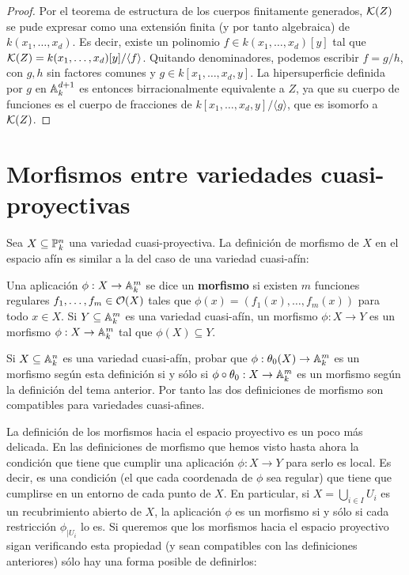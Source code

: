 \documentclass[ACGA.tex]{subfiles}
\begin{document}
\begin{proof} Por el teorema de estructura de los cuerpos finitamente generados, ${\mathcal K}(Z)$ se pude expresar como una extensión finita (y por tanto algebraica) de $k(x_1,\ldots,x_d)$. Es decir, existe un polinomio $f\in k(x_1,\ldots,x_d)[y]$ tal que ${\mathcal K}(Z)=k(x_1,\ldots,x_d)[y]/\langle f\rangle$. Quitando denominadores, podemos escribir $f=g/h$, con $g,h$ sin factores comunes y $g\in k[x_1,\ldots,x_d,y]$. La hipersuperficie definida por $g$ en $\mathbb{A}^{d+1}_k$ es entonces birracionalmente equivalente a $Z$, ya que su cuerpo de funciones es el cuerpo de fracciones de $k[x_1,\ldots,x_d,y]/\langle g\rangle$, que es isomorfo a ${\mathcal K}(Z)$.
\end{proof}





 




\section{Morfismos entre variedades cuasi-proyectivas}

Sea $X\subseteq\mathbb{P}^n_k$ una variedad cuasi-proyectiva. La definición de morfismo de $X$ en el espacio afín es similar a la del caso de una variedad cuasi-afín:

\begin{defi}
 Una aplicación $\phi:X\to \mathbb{A}^m_k$ se dice un {\bf morfismo} si existen $m$ funciones regulares $f_1,\ldots,f_m\in{\mathcal O}(X)$ tales que $\phi(x)=(f_1(x),\ldots,f_m(x))$ para todo $x\in X$. Si $Y\subseteq\mathbb{A}^m_k$ es una variedad cuasi-afín, un morfismo $\phi:X\to Y$ es un morfismo $\phi:X\to\mathbb{A}^m_k$ tal que $\phi(X)\subseteq Y$.
\end{defi}

\begin{ejer}
 Si $X\subseteq\mathbb{A}^n_k$ es una variedad cuasi-afín, probar que $\phi:\theta_0(X)\to\mathbb{A}^m_k$ es un morfismo según esta definición si y sólo si $\phi\circ\theta_0:X\to\mathbb{A}^m_k$ es un morfismo según la definición del tema anterior. Por tanto las dos definiciones de morfismo son compatibles para variedades cuasi-afines.
\end{ejer}

La definición de los morfismos hacia el espacio proyectivo es un poco más delicada. En las definiciones de morfismo que hemos visto hasta ahora la condición que tiene que cumplir una aplicación $\phi:X\to Y$ para serlo es local. Es decir, es una condición (el que cada coordenada de $\phi$ sea regular) que tiene que cumplirse en un entorno de cada punto de $X$. En particular, si $X=\bigcup_{i\in I} U_i$ es un recubrimiento abierto de $X$, la aplicación $\phi$ es un morfismo si y sólo si cada restricción $\phi_{|U_i}$ lo es. Si queremos que los morfismos hacia el espacio proyectivo sigan verificando esta propiedad (y sean compatibles con las definiciones anteriores) sólo hay una forma posible de definirlos:
\end{document}
